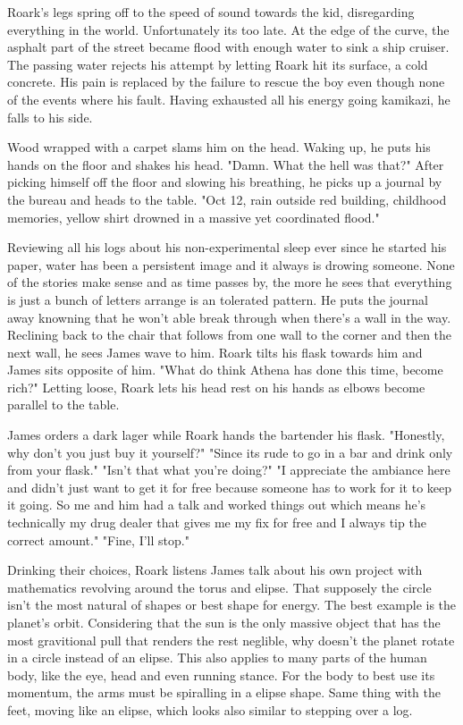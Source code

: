		Roark's legs spring off to the speed of sound towards the kid, disregarding everything in the world. Unfortunately its too late. At 
	the edge of the curve, the asphalt part of the street became flood with enough water to sink a ship cruiser. The passing water rejects his
	attempt by letting Roark hit its surface, a cold concrete. His pain is replaced by the failure to rescue the boy even though none of the
	events where his fault. Having exhausted all his energy going kamikazi, he falls to his side.

		Wood wrapped with a carpet slams him on the head. Waking up, he puts his hands on the floor and shakes his head. "Damn. What the hell
	was that?" After picking himself off the floor and slowing his breathing, he picks up a journal by the bureau and heads to the table. "Oct 12,
	rain outside red building, childhood memories, yellow shirt drowned in a massive yet coordinated flood."

		Reviewing all his logs about his non-experimental sleep ever since he started his paper, water has been a persistent image and it 
	always is drowing someone. None of the stories make sense and as time passes by, the more he sees that everything is just a bunch of letters
	arrange is an tolerated pattern. He puts the journal away knowning that he won't able break through when there's a wall in the way. Reclining
	back to the chair that follows from one wall to the corner and then the next wall, he sees James wave to him. Roark tilts his flask towards
	him and James sits opposite of him. "What do think Athena has done this time, become rich?" Letting loose, Roark lets his head rest on his 
	hands as elbows become parallel to the table.

		James orders a dark lager while Roark hands the bartender his flask. "Honestly, why don't you just buy it yourself?" "Since its rude
	to go in a bar and drink only from your flask." "Isn't that what you're doing?" "I appreciate the ambiance here and didn't just want to get
	it for free because someone has to work for it to keep it going. So me and him had a talk and worked things out which means he's technically
	my drug dealer that gives me my fix for free and I always tip the correct amount." "Fine, I'll stop."

		Drinking their choices, Roark listens James talk about his own project with mathematics revolving around the torus and elipse. That
	supposely the circle isn't the most natural of shapes or best shape for energy. The best example is the planet's orbit. Considering that
	the sun is the only massive object that has the most gravitional pull that renders the rest neglible, why doesn't the planet rotate in a 
	circle instead of an elipse. This also applies to many parts of the human body, like the eye, head and even running stance. For the body
	to best use its momentum, the arms must be spiralling in a elipse shape. Same thing with the feet, moving like an elipse, which looks also
	similar to stepping over a log.

